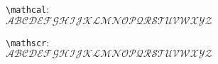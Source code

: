 \documentclass[12pt]{article}
\newcommand{\upperalphabet}{ABCDEFGHIJKLMNOPQRSTUVWXYZ}
\begin{document}
\texttt{\textbackslash mathcal}:\\
$\mathcal{\upperalphabet}$

\texttt{\textbackslash mathscr}:\\
$\mathscr{\upperalphabet}$
\end{document}
